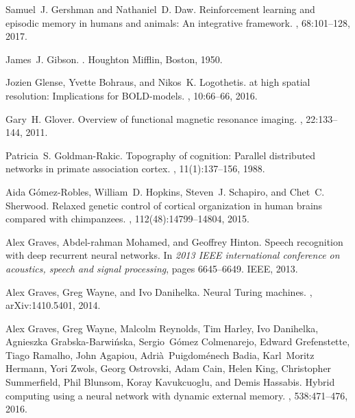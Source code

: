 \documentclass[letterpaper,11pt]{article}
\begin{document}
\begin{thebibliography}{100}
Samuel~J. Gershman and Nathaniel~D. Daw.
\newblock Reinforcement learning and episodic memory in humans and animals:
  {A}n integrative framework.
, 68:101–128, 2017.

James~J. Gibson.
.
\newblock Houghton Mifflin, Boston, 1950.

Jozien Glense, Yvette Bohraus, and Nikos~K. Logothetis.
 at high spatial resolution: Implications for {BOLD}-models.
, 10:66--66, 2016.

Gary~H. Glover.
\newblock Overview of functional magnetic resonance imaging.
, 22:133--144, 2011.

Patricia~S. Goldman-Rakic.
\newblock Topography of cognition: Parallel distributed networks in primate
  association cortex.
, 11(1):137--156, 1988.

Aida G{\'o}mez-Robles, William~D. Hopkins, Steven~J. Schapiro, and Chet~C.
  Sherwood.
\newblock Relaxed genetic control of cortical organization in human brains
  compared with chimpanzees.
,
  112(48):14799--14804, 2015.

Alex Graves, Abdel-rahman Mohamed, and Geoffrey Hinton.
\newblock Speech recognition with deep recurrent neural networks.
\newblock In {\em 2013 IEEE international conference on acoustics, speech and
  signal processing}, pages 6645--6649. IEEE, 2013.

Alex Graves, Greg Wayne, and Ivo Danihelka.
\newblock Neural {T}uring machines.
, arXiv:1410.5401, 2014.

Alex Graves, Greg Wayne, Malcolm Reynolds, Tim Harley, Ivo Danihelka, Agnieszka
  Grabska-Barwi\'{n}ska, Sergio~G\'{o}mez Colmenarejo, Edward Grefenstette,
  Tiago Ramalho, John Agapiou, Adri\`{a}~Puigdom\'{e}nech Badia, Karl~Moritz
  Hermann, Yori Zwols, Georg Ostrovski, Adam Cain, Helen King, Christopher
  Summerfield, Phil Blunsom, Koray Kavukcuoglu, and Demis Hassabis.
\newblock Hybrid computing using a neural network with dynamic external memory.
, 538:471--476, 2016.


\end{thebibliography}
\end{document}
